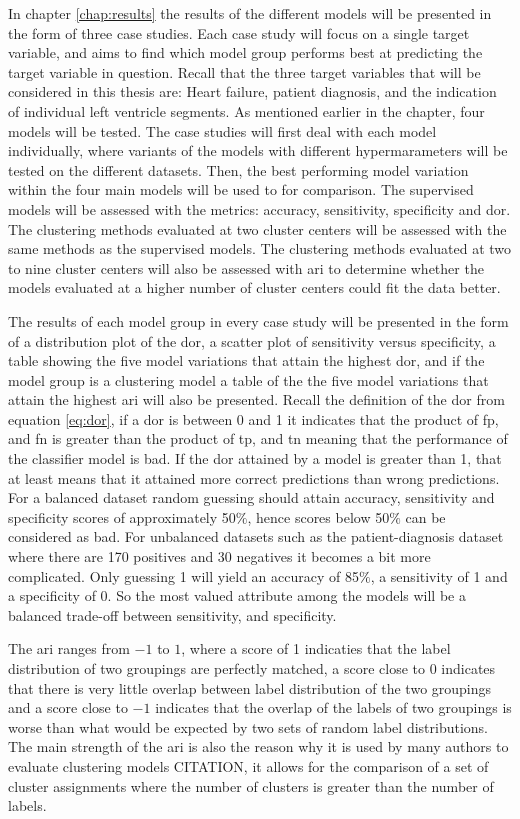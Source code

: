 In chapter \ref{chap:results} the results of the different models will be presented in the form of three case studies. Each case study will focus on a single target variable, and aims to find which model group performs best at predicting the target variable in question. Recall that the three target variables that will be considered in this thesis are: Heart failure, patient diagnosis, and the indication of individual left ventricle segments. As mentioned earlier in the chapter, four models will be tested. The case studies will first deal with each model individually, where variants of the models with different hypermarameters will be tested on the different datasets. Then, the best performing model variation within the four main models will be used to for comparison. The supervised models will be assessed with the metrics: accuracy, sensitivity, specificity and \acrshort{dor}. The clustering methods evaluated at two cluster centers will be assessed with the same methods as the supervised models. The clustering methods evaluated at two to nine cluster centers will also be assessed with \acrshort{ari} to determine whether the models evaluated at a higher number of cluster centers could fit the data better. \bigskip

The results of each model group in every case study will be presented in the form of a distribution plot of the \acrshort{dor}, a scatter plot of sensitivity versus specificity, a table showing the five model variations that attain the highest \acrshort{dor}, and if the model group is a clustering model a table of the the five model variations that attain the highest \acrshort{ari} will also be presented. Recall the definition of the \acrshort{dor} from equation \eqref{eq:dor}, if a \acrshort{dor} is between 0 and 1 it indicates that the product of \acrshort{fp}, and \acrshort{fn} is greater than the product of \acrshort{tp}, and \acrshort{tn} meaning that the performance of the classifier model is bad. If the \acrshort{dor} attained by a model is greater than 1, that at least means that it attained more correct predictions than wrong predictions. For a balanced dataset random guessing should attain accuracy, sensitivity and specificity scores of approximately 50$\%$, hence scores below 50$\%$ can be considered as bad. For unbalanced datasets such as the patient-diagnosis dataset where there are 170 positives and 30 negatives it becomes a bit more complicated. Only guessing 1 will yield an accuracy of 85$\%$, a sensitivity of 1 and a specificity of 0. So the most valued attribute among the models will be a balanced trade-off between sensitivity, and specificity. \bigskip

The \acrshort{ari} ranges from $-1$ to $1$, where a score of 1 indicaties that the label distribution of two groupings are perfectly matched, a score close to 0 indicates that there is very little overlap between label distribution of the two groupings and a score close to $-1$ indicates that the overlap of the labels of two groupings is worse than what would be expected by two sets of random label distributions. The main strength of the \acrshort{ari} is also the reason why it is used by many authors to evaluate clustering models CITATION, it allows for the comparison of a set of cluster assignments where the number of clusters is greater than the number of labels.
